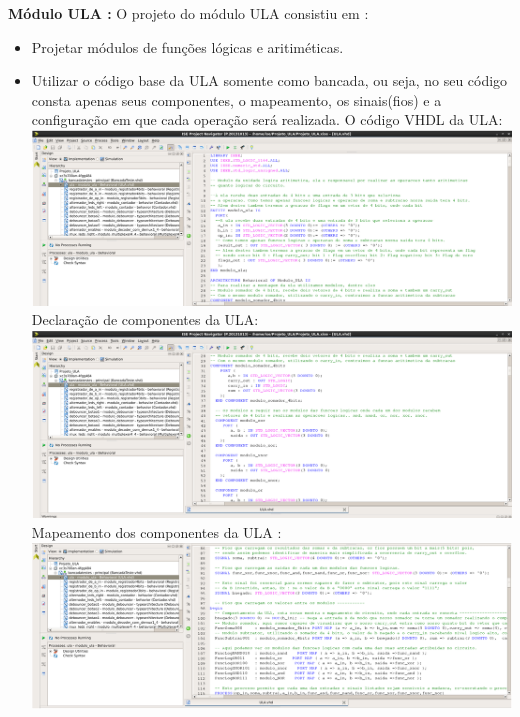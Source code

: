 \documentclass[11pt]{book}
\begin{document}
\textbf{Módulo ULA :} 
\newline\newline
O projeto do módulo ULA consistiu em : 
\newline\newline
\begin{itemize}
    \item Projetar módulos de funções lógicas e aritiméticas.
    \item Utilizar o código base da ULA somente como bancada, ou seja, no seu código consta apenas seus componentes, o mapeamento, os sinais(fios) e a configuração em que cada operação será realizada.  
\newline\newline
    O código VHDL da ULA:
\newline\newline
\includegraphics[width=1.1\textwidth]{Codigo_ULA.png}
\newline
    Declaração de componentes da ULA:
\newline\newline
\includegraphics[width=1.1\textwidth]{ULA_comp_cod.png}
\newline
    Mapeamento dos componentes da ULA :
\newline\newline
\includegraphics[width=1.1\textwidth]{ULA_comp.png}

\end{itemize}
\end{document}
